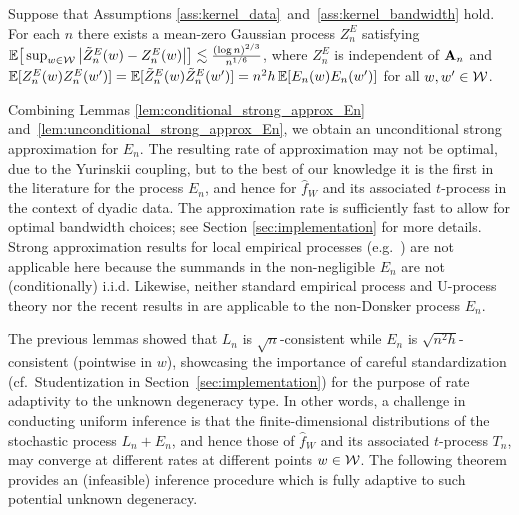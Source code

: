 \begin{lemma}
  \label{lem:unconditional_strong_approx_En}

  Suppose that Assumptions
  \ref{ass:kernel_data}~and~\ref{ass:kernel_bandwidth} hold.
  For each $n$ there exists
  a mean-zero Gaussian process $Z^E_n$ satisfying
  $\mathbb{E}\big[ \sup_{w \in \mathcal{W}} \big|\tilde Z_n^E(w) - Z_n^E(w)\big| \big]
  \lesssim \frac{(\log n)^{2/3}}{n^{1/6}}$,
  where
  $Z_n^E$ is independent of $\mathbf{A}_n$ and
  $\mathbb{E}[Z_n^E(w)Z_n^E(w')]=\mathbb{E}[\tilde Z_n^E(w)\tilde Z_n^E(w')]
  = n^2h \, \mathbb{E}[E_n(w)E_n(w')]$
  for all $w, w' \in \mathcal{W}$.
\end{lemma}


Combining Lemmas \ref{lem:conditional_strong_approx_En}
and~\ref{lem:unconditional_strong_approx_En},
we obtain an unconditional strong approximation for $E_n$.
The resulting rate of approximation may not be optimal,
due to the Yurinskii coupling, but to the best of our knowledge
it is the first in the literature for the process
$E_n$, and hence for $\hat{f}_W$ and its associated $t$-process in the
context of dyadic data.
The approximation rate is
sufficiently fast to allow for optimal bandwidth choices; see Section
\ref{sec:implementation} for more details.
Strong approximation results for local empirical processes
(e.g.\ \citealp{gine2010confidence})
are not applicable here because the summands in the
non-negligible $E_n$
are not (conditionally) i.i.d.
Likewise, neither standard empirical process and U-process theory
\citep{van1996weak,gine2021mathematical} nor the recent results in
\citet{davezies2021exchangeable} are applicable
to the non-Donsker process $E_n$.

The previous lemmas showed that $L_n$ is
$\sqrt{n}$-consistent while $E_n$ is $\sqrt{n^2h}$-consistent
(pointwise in $w$),
showcasing the importance of careful standardization
(cf.\ Studentization in Section~\ref{sec:implementation})
for the purpose of rate
adaptivity to the unknown degeneracy type.
In other
words, a challenge in conducting uniform inference is that the
finite-dimensional distributions of the stochastic process $L_n+E_n$,
and hence those of $\hat{f}_W$ and its associated $t$-process $T_n$,
may converge at different rates at different points $w\in\mathcal{W}$.
The following theorem provides an
(infeasible)
inference procedure which is fully adaptive to
such potential unknown degeneracy.

